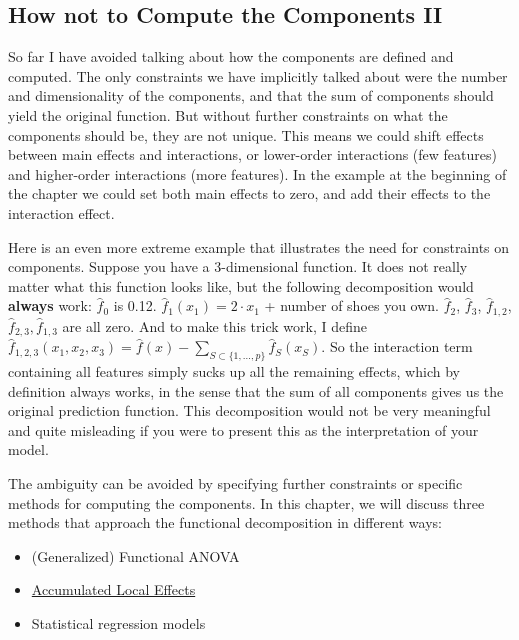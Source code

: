 \documentclass[
  11pt,
]{scrbook}
\providecommand{\tightlist}{%
  \setlength{\itemsep}{0pt}\setlength{\parskip}{0pt}}
\begin{document}
\hypertarget{how-not-to-compute-the-components-ii}{%
\subsection{How not to Compute the Components II}\label{how-not-to-compute-the-components-ii}}

So far I have avoided talking about how the components are defined and computed.
The only constraints we have implicitly talked about were the number and dimensionality of the components, and that the sum of components should yield the original function.
But without further constraints on what the components should be, they are not unique.
This means we could shift effects between main effects and interactions, or lower-order interactions (few features) and higher-order interactions (more features).
In the example at the beginning of the chapter we could set both main effects to zero, and add their effects to the interaction effect.

Here is an even more extreme example that illustrates the need for constraints on components.
Suppose you have a 3-dimensional function.
It does not really matter what this function looks like, but the following decomposition would \textbf{always} work:
\(\hat{f}_0\) is 0.12.
\(\hat{f}_1(x_1)=2\cdot{}x_1\) + number of shoes you own.
\(\hat{f}_2\), \(\hat{f}_3\), \(\hat{f}_{1,2}\), \(\hat{f}_{2,3}, \hat{f}_{1,3}\) are all zero.
And to make this trick work, I define \(\hat{f}_{1,2,3}(x_1,x_2,x_3)=\hat{f}(x)-\sum_{S\subset\{1,\ldots,p\}}\hat{f}_S(x_S)\).
So the interaction term containing all features simply sucks up all the remaining effects, which by definition always works, in the sense that the sum of all components gives us the original prediction function.
This decomposition would not be very meaningful and quite misleading if you were to present this as the interpretation of your model.

The ambiguity can be avoided by specifying further constraints or specific methods for computing the components.
In this chapter, we will discuss three methods that approach the functional decomposition in different ways:

\begin{itemize}
\tightlist
\item
  (Generalized) Functional ANOVA
\item
  \protect\hyperlink{ale}{Accumulated Local Effects}
\item
  Statistical regression models
\end{itemize}
\end{document}
